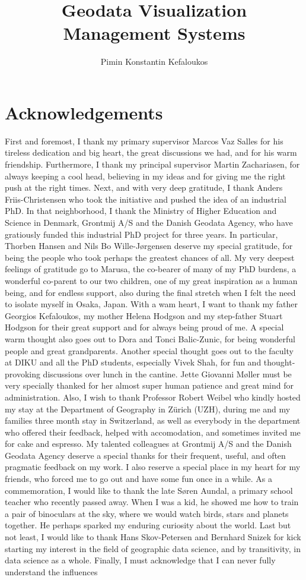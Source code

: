 \documentclass[11pt, oneside]{report}
\title{Geodata Visualization Management Systems}
\author{Pimin Konstantin Kefaloukos}
\begin{document}
\maketitle

\section*{Acknowledgements}
First and foremost, I thank my primary supervisor Marcos Vaz Salles for his tireless dedication and big heart, the great discussions we had, and for his warm friendship. Furthermore, I thank my principal supervisor Martin Zachariasen, for always keeping a cool head, believing in my ideas and for giving me the right push at the right times. Next, and with very deep gratitude, I thank Anders Friis-Christensen who took the initiative and pushed the idea of an industrial PhD. In that neighborhood, I thank the Ministry of Higher Education and Science in Denmark, Grontmij A/S and the Danish Geodata Agency, who have gratiously funded this industrial PhD project for three years. In particular, Thorben Hansen and Nils Bo Wille-J{\o}rgensen deserve my special gratitude, for being the people who took perhaps the greatest chances of all. My very deepest feelings of gratitude go to Marusa, the co-bearer of many of my PhD burdens, a wonderful co-parent to our two children, one of my great inspiration as a human being, and for endless support, also during the final stretch when I felt the need to isolate myself in Osaka, Japan. With a wam heart, I want to thank my father Georgios Kefaloukos, my mother Helena Hodgson and my step-father Stuart Hodgson for their great support and for always being proud of me. A special warm thought also goes out to Dora and Tonci Balic-Zunic, for being wonderful people and great grandparents. Another special thought goes out to the faculty at DIKU and all the PhD students, especially Vivek Shah, for fun and thought-provoking discussions over lunch in the cantine. Jette Giovanni M{\o}ller must be very specially thanked for her almost super human patience and great mind for administration. Also, I wish to thank Professor Robert Weibel who kindly hosted my stay at the Department of Geography in Z{\"u}rich (UZH),  during me and my families three month stay in Switzerland, as well as everybody in the department who offered their feedback, helped with accomodation, and sometimes invited me for cake and espresso. My talented colleagues at Grontmij A/S and the Danish Geodata Agency deserve a special thanks for their frequent, useful, and often pragmatic feedback on my work. I also reserve a special place in my heart for my friends, who forced me to go out and have some fun once in a while. As a commemoration, I would like to thank the late S{\o}ren Aundal, a primary school teacher who recently passed away. When I was a kid, he showed me how to train a pair of binoculars at the sky, where we would watch birds, stars and planets together. He perhaps sparked my enduring curiosity about the world. Last but not least, I would like to thank Hans Skov-Petersen and Bernhard Snizek for kick starting my interest in the field of geographic data science, and by transitivity, in data science as a whole. Finally, I must acknowledge that I can never fully understand the influences 
\end{document}
